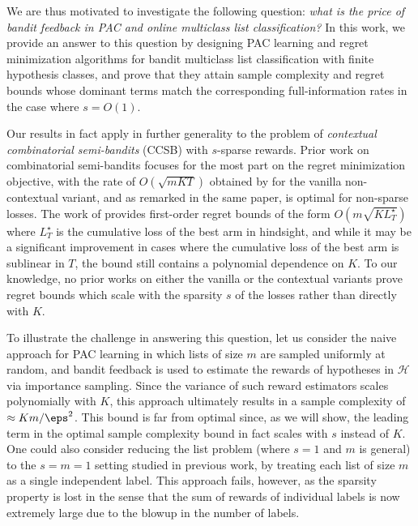 \documentclass[11pt]{article}
\newcommand{\poly}{\operatorname{poly}}
\newcommand{\tk}[1]{\textcolor{magenta}{\bf \{TK: #1\}}}
\newcommand{\calH}{\mathcal{H}}
\theoremstyle{plain}
\begin{document}
We are thus motivated to investigate the following question: \emph{what is the price of bandit feedback in PAC and online multiclass list classification?} In this work, we provide an answer to this question by designing PAC learning and regret minimization algorithms for bandit multiclass list classification with finite hypothesis classes, and prove that they attain sample complexity and regret bounds whose dominant terms match the corresponding full-information rates in the case where $s = O(1)$. 

Our results in fact apply in further generality to the problem of \emph{contextual combinatorial semi-bandits} (CCSB) with $s$-sparse rewards. 
Prior work on combinatorial semi-bandits focuses for the most part on the regret minimization objective, with the rate of $O(\sqrt{mKT})$ obtained by \cite{audibert2014regret} for the vanilla non-contextual variant, and as remarked in the same paper, is optimal for non-sparse losses. The work of \cite{neu2015first} provides first-order regret bounds of the form $O(m \sqrt{K L^\star_T})$ where $L^\star_T$ is the cumulative loss of the best arm in hindsight, and while it may be a significant improvement in cases where the cumulative loss of the best arm is sublinear in $T$, the bound still contains a polynomial dependence on $K$.  To our knowledge, no prior works on either the vanilla or the contextual variants prove regret bounds which scale with the sparsity $s$ of the losses rather than directly with $K$.

To illustrate the challenge in answering this question, let us consider the naive approach for PAC learning in which lists of size $m$ are sampled uniformly at random, and bandit feedback is used to estimate the rewards of hypotheses in $\calH$ via importance sampling. Since the variance of such reward estimators scales polynomially with $K$, this approach ultimately results in a sample complexity of $\approx  K m / \eps^2$. This bound is far from optimal since, as we will show, the leading term in the optimal sample complexity bound in fact scales with $s$ instead of $K$. 
One could also consider reducing the list problem (where $s=1$ and $m$ is general) to the $s=m=1$ setting studied in previous work, by treating each list of size $m$ as a single independent label. This approach fails, however, as the sparsity property is lost in the sense that the sum of rewards of individual labels is now extremely large due to the blowup in the number of labels.
\end{document}
